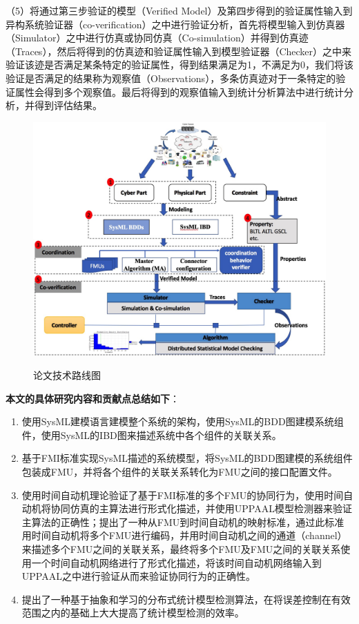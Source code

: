 （5）将通过第三步验证的模型（Verified Model）及第四步得到的验证属性输入到异构系统验证器（co-verification）之中进行验证分析，首先将模型输入到仿真器（Simulator）之中进行仿真或协同仿真（Co-simulation）并得到仿真迹（Traces），然后将得到的仿真迹和验证属性输入到模型验证器（Checker）之中来验证该迹是否满足某条特定的验证属性，得到结果满足为1，不满足为0，我们将该验证是否满足的结果称为观察值（Observations），多条仿真迹对于一条特定的验证属性会得到多个观察值。最后将得到的观察值输入到统计分析算法中进行统计分析，并得到评估结果。
\begin{figure}[htbp]
	\centering
	{\includegraphics[width=5.0in]{fig/1/paper-framework.jpg}}
	\caption{论文技术路线图}\label{pa-fra}
\end{figure}

\textbf{本文的具体研究内容和贡献点总结如下}：
\begin{enumerate}
	\item 使用SysML建模语言建模整个系统的架构，使用SysML的BDD图建模系统组件，使用SysML的IBD图来描述系统中各个组件的关联关系。
	\item 基于FMI标准实现SysML描述的系统模型，将SysML的BDD图建模的系统组件包装成FMU，并将各个组件的关联关系转化为FMU之间的接口配置文件。
    \item 使用时间自动机理论验证了基于FMI标准的多个FMU的协同行为，使用时间自动机将协同仿真的主算法进行形式化描述，并使用UPPAAL模型检测器来验证主算法的正确性；提出了一种从FMU到时间自动机的映射标准，通过此标准用时间自动机将多个FMU进行编码，并用时间自动机之间的通道（channel）来描述多个FMU之间的关联关系，最终将多个FMU及FMU之间的关联关系使用一个时间自动机网络进行了形式化描述，将该时间自动机网络输入到UPPAAL之中进行验证从而来验证协同行为的正确性。
    \item 提出了一种基于抽象和学习的分布式统计模型检测算法，在将误差控制在有效范围之内的基础上大大提高了统计模型检测的效率。
\end{enumerate}


